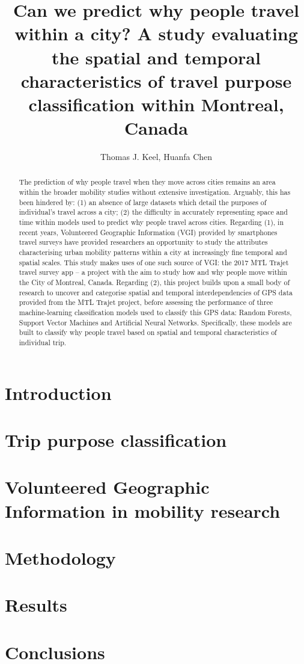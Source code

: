 \documentclass[11pt]{article} %
\title{Can we predict why people travel within a city? A study evaluating the spatial and temporal characteristics of travel purpose classification within Montreal, Canada}
\author{Thomas J. Keel, Huanfa Chen}
\date{} %
\begin{document}
\maketitle
\hrulefill
\begin{abstract}
The prediction of why people travel when they move across cities remains an area within the broader mobility studies without extensive investigation. Arguably, this has been hindered by: (1) an absence of large datasets which detail the purposes of individual’s travel across a city; (2) the difficulty in accurately representing space and time within models used to predict why people travel across cities. 
Regarding (1), in recent years, Volunteered Geographic Information (VGI) provided by smartphones travel surveys have provided researchers an opportunity to study the attributes characterising urban mobility patterns within a city at increasingly fine temporal and spatial scales. This study makes uses of one such source of VGI: the 2017 MTL Trajet travel survey app – a project with the aim to study how and why people move within the City of Montreal, Canada. Regarding (2), this project builds upon a small body of research to uncover and categorise spatial and temporal interdependencies of GPS data provided from the MTL Trajet project, before assessing the performance of three machine-learning classification models used to classify this GPS data: Random Forests, Support Vector Machines and Artificial Neural Networks. Specifically, these models are built to classify why people travel based on spatial and temporal characteristics of individual trip. 
\end{abstract}
\hrulefill
\section{Introduction}

  
\section{Trip purpose classification}

  
\section{Volunteered Geographic Information in mobility research}

  
\section{Methodology}

  
\section{Results}

  
\section{Conclusions}

  
\end{document}
